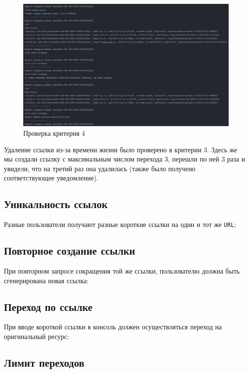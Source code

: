 \documentclass[a4paper, 14pt]{article}
\begin{document}
\begin{figure}[H]
	\centering
	\includegraphics[width=17cm]{resources/8.png}
	\caption{Проверка критерия 4}
\end{figure}

Удаление ссылки из-за времени жизни было проверено в критерии 3. Здесь же мы создали ссылку с максимальным числом перехода 3, перешли по ней 3 раза и увидели, что на третий раз она удалилась (также было получено соответствующее уведомление).

\subsection{Уникальность ссылок}

Разные пользователи получают разные короткие ссылки на один и тот же \texttt{URL}:

\subsection{Повторное создание ссылки}

При повторном запросе сокращения той же ссылки, пользователю должна быть сгенерирована новая ссылка:

\subsection{Переход по ссылке}

При вводе короткой ссылки в консоль должен осуществляться переход на оригинальный ресурс:

\subsection{Лимит переходов}
\end{document}
